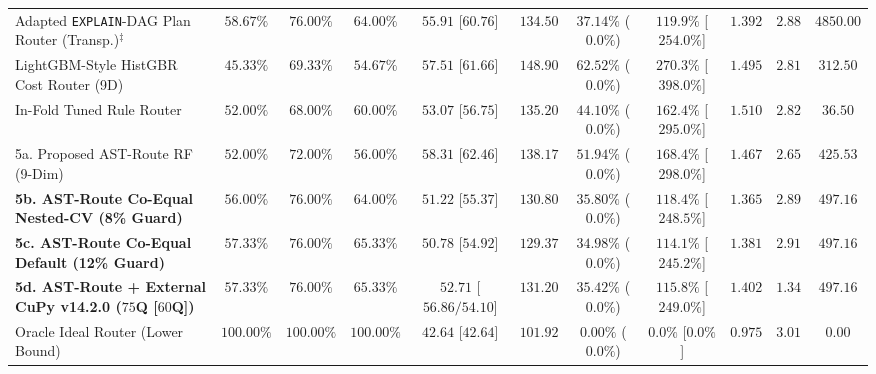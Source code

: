 \documentclass[10pt,a4paper]{article}
\newenvironment{fitasttable}{%
  \begin{lrbox}{\asttblbox}%
}{%
  \end{lrbox}%
  \sbox{\asttblboxB}{%
    \ifdim\wd\asttblbox>0.96\textwidth
      \resizebox{0.96\textwidth}{!}{\usebox{\asttblbox}}%
    \else
      \usebox{\asttblbox}%
    \fi
  }%
  \ifdim\ht\asttblboxB>0.72\textheight
    \resizebox{!}{0.72\textheight}{\usebox{\asttblboxB}}%
  \else
    \usebox{\asttblboxB}%
  \fi
}
\begin{document}
\begin{table}[!htbp]
\begin{fitasttable}
\begin{tabular}{@{}lcccccccccc@{}}
Adapted \texttt{EXPLAIN}-DAG Plan Router (Transp.)$^{\ddagger}$ & $58.67\%$ & $76.00\%$ & $64.00\%$ & $55.91$ [$60.76$] & $134.50$ & $37.14\%$ ($0.0\%$) & $119.9\%$ [$254.0\%$] & $1.392$ & $2.88$ & $4850.00$ \\
LightGBM-Style HistGBR Cost Router (9D) & $45.33\%$ & $69.33\%$ & $54.67\%$ & $57.51$ [$61.66$] & $148.90$ & $62.52\%$ ($0.0\%$) & $270.3\%$ [$398.0\%$] & $1.495$ & $2.81$ & $312.50$ \\
In-Fold Tuned Rule Router & $52.00\%$ & $68.00\%$ & $60.00\%$ & $53.07$ [$56.75$] & $135.20$ & $44.10\%$ ($0.0\%$) & $162.4\%$ [$295.0\%$] & $1.510$ & $2.82$ & $36.50$ \\
5a. Proposed AST-Route RF (9-Dim) & $52.00\%$ & $72.00\%$ & $56.00\%$ & $58.31$ [$62.46$] & $138.17$ & $51.94\%$ ($0.0\%$) & $168.4\%$ [$298.0\%$] & $1.467$ & $2.65$ & $425.53$ \\
\textbf{5b. AST-Route Co-Equal Nested-CV (8\% Guard)} & $\mathbf{56.00\%}$ & $\mathbf{76.00\%}$ & $\mathbf{64.00\%}$ & $\mathbf{51.22}$ [$\mathbf{55.37}$] & $\mathbf{130.80}$ & $\mathbf{35.80\%}$ ($\mathbf{0.0\%}$) & $\mathbf{118.4\%}$ [$\mathbf{248.5\%}$] & $\mathbf{1.365}$ & $\mathbf{2.89}$ & $\mathbf{497.16}$ \\
\textbf{5c. AST-Route Co-Equal Default (12\% Guard)} & $\mathbf{57.33\%}$ & $\mathbf{76.00\%}$ & $\mathbf{65.33\%}$ & $\mathbf{50.78}$ [$\mathbf{54.92}$] & $\mathbf{129.37}$ & $\mathbf{34.98\%}$ ($\mathbf{0.0\%}$) & $\mathbf{114.1\%}$ [$\mathbf{245.2\%}$] & $\mathbf{1.381}$ & $\mathbf{2.91}$ & $\mathbf{497.16}$ \\
\textbf{5d. AST-Route + External CuPy v14.2.0 ($75$Q [$60$Q])} & $\mathbf{57.33\%}$ & $\mathbf{76.00\%}$ & $\mathbf{65.33\%}$ & $\mathbf{52.71}$ [$\mathbf{56.86 / 54.10}$] & $\mathbf{131.20}$ & $\mathbf{35.42\%}$ ($\mathbf{0.0\%}$) & $\mathbf{115.8\%}$ [$\mathbf{249.0\%}$] & $\mathbf{1.402}$ & $\mathbf{1.34}$ & $\mathbf{497.16}$ \\
Oracle Ideal Router (Lower Bound) & $100.00\%$ & $100.00\%$ & $100.00\%$ & $42.64$ [$42.64$] & $101.92$ & $0.00\%$ ($0.0\%$) & $0.0\%$ [$0.0\%$] & $0.975$ & $3.01$ & $0.00$ \\
\bottomrule

\end{tabular}
\end{fitasttable}
\end{table}
\end{document}
